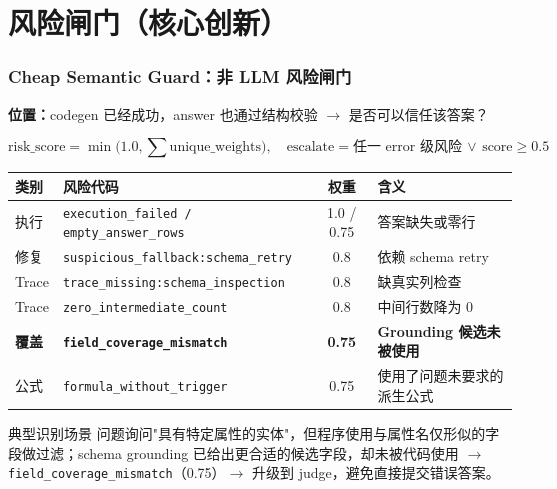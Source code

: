 \documentclass[11pt, aspectratio=169]{beamer}
\begin{document}

\section{风险闸门（核心创新）}

\begin{frame}
\frametitle{Cheap Semantic Guard：非 LLM 风险闸门}

\textbf{位置：}codegen 已经成功，answer 也通过结构校验 $\to$ 是否可以信任该答案？

\vspace{-0.2em}
\begin{equation*}
\text{risk\_score} = \min\!\big(1.0,\textstyle\sum \text{unique\_weights}\big), \quad
\text{escalate} = \text{任一 error 级风险} \,\lor\, \text{score} \geq 0.5
\end{equation*}

\vspace{-0.3em}
\begin{center}
\scriptsize
\begin{tabular}{llcl}
\toprule
\textbf{类别} & \textbf{风险代码} & \textbf{权重} & \textbf{含义} \\
\midrule
执行 & \texttt{execution\_failed / empty\_answer\_rows} & 1.0 / 0.75 & 答案缺失或零行 \\
修复 & \texttt{suspicious\_fallback:schema\_retry} & 0.8 & 依赖 schema retry \\
Trace & \texttt{trace\_missing:schema\_inspection} & 0.8 & 缺真实列检查 \\
Trace & \texttt{zero\_intermediate\_count} & 0.8 & 中间行数降为 0 \\
\textbf{覆盖} & \texttt{\textbf{field\_coverage\_mismatch}} & \textbf{0.75} & \textbf{Grounding 候选未被使用} \\
公式 & \texttt{formula\_without\_trigger} & 0.75 & 使用了问题未要求的派生公式 \\
\bottomrule
\end{tabular}
\end{center}

\vspace{-0.2em}
\begin{alertblock}{典型识别场景}
\scriptsize
问题询问"具有特定属性的实体"，但程序使用与属性名仅形似的字段做过滤；schema grounding 已给出更合适的候选字段，却未被代码使用 $\to$ \texttt{field\_coverage\_mismatch}（0.75）$\to$ \alert{升级到 judge}，避免直接提交错误答案。
\end{alertblock}

\end{frame}
\end{document}
